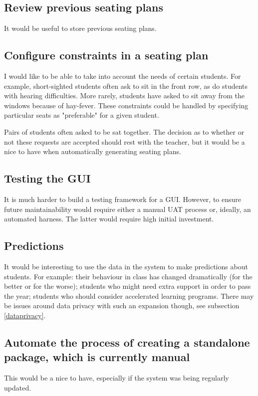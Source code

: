 \documentclass[10pt]{article}
\begin{document}
\subsection{Review previous seating plans}
It would be useful to store previous seating plans.

\subsection{Configure constraints in a seating plan}
I would like to be able to take into account the needs of certain students. For example, short-sighted students often ask to sit in the front row, as do students with hearing difficulties. More rarely, students have asked to sit away from the windows because of hay-fever. These constraints could be handled by specifying particular seats as "preferable" for a given student.

Pairs of students often asked to be sat together. The decision as to whether or not these requests are accepted should rest with the teacher, but it would be a nice to have when automatically generating seating plans.

\subsection{Testing the GUI}
It is much harder to build a testing framework for a GUI. However, to ensure future maintainability would require either a manual UAT process or, ideally, an automated harness. The latter would require high initial investment.

\subsection{Predictions}
It would be interesting to use the data in the system to make predictions about students. For example: their behaviour in class has changed dramatically (for the better or for the worse); students who might need extra support in order to pass the year; students who should consider accelerated learning programs. There may be issues around data privacy with such an expansion though, see subsection \ref{dataprivacy}.

\subsection{Automate the process of creating a standalone package, which is currently manual}
This would be a nice to have, especially if the system was being regularly updated.
\end{document}

